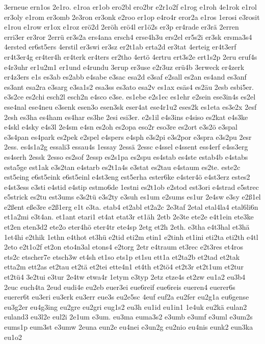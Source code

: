 {3erneue
ern1os
2e1ro.
e1roa
er1ob
ero2bl
ero2br
e2r1o2f
e1rog
e1roh
4e1rok
e1rol
er3oly
e1rom
er3omb
2e3ron
er3onk
e2roo
er1op
e4ro4r
eror2a
e1ros
1erosi
e3rosit
e1rou
e1row
er1ox
e1roz
erö2d
2eröh
erö4l
er1ö2s
er3p
er4rade
er3rä
2erren
erri3er
er3ror
2errü
er3s2a
ers4ana
ersch4
erse4h3u
ers2el
er5s2i
er3sk
ersma3s4
4ersted
er6st5ers
4erstil
er3swi
er3sz
er2t1ab
erta2d
er3tat
4erteig
er4t3erf
er4t3er4g
er4ter4h
er4terk
er4ters
er2tho
4ertö
4ertru
ert3s2e
ert1s2p
2eru
eruf4s
e4r3uhr
er1u2m1
er1und
e4rundu
3erup
er3use
e2r3uz
erü4b
3erweck
er4zerk
er4z3ers
e1s
es3ab
es2abb
e4sabe
e3sac
esa2d
e3saf
e2sall
es2an
es4and
es3anf
es3ant
esa2ra
e3sarg
e3sa1s2
esa3ss
es3ato
esa2v
es1ax
esäs4
es2äu
2esb
esbi5er.
e3s2ce
es2chi
esch2l
esch2n
e4sco
e3se.
es1ebe
e2s1ec
es1ehr
e2sein
ese3in4s
es2el
ese4nal
ese4neu
e3senk
esen3o
esen3sk
eser4at
ese4r1u2
eses2k
es1eta
es3e2x
2esf
2esh
es3ha
es4ham
es4har
es3he
2esi
esi3er.
e2s1il
e4s3ins
e4siso
es2kat
e4s3ke
e4skl
e4sky
e4s3l
2e4sm
e4sn
es2oh
es2opa
eso2r
eso3re
es2ort
e3s2ö
e3spal
e3s4pan
es4park
es2pek
e2spel
e4spers
e4sph
e3s2pi
e3s2por
e3spra
e3s2pu
2esr
2ess.
es4s1a2g
essali3
essau4s
1essay
2essä
2essc
e4ssel
e4ssent
ess4erf
e4ss3erg
es4serh
2essk
2esso
es2sof
2essp
es2s1pa
es2spu
es4stab
es4ste
estab4b
e4stabs
esta5ge
est1ak
e3s2tan
e4starb
es2t1a4s
e3stat
es2tau
e4staum
es2te.
este2c
est5eing
e6st5eink
e6st5einl
e4st3eng
est5erha
ester6ke
e4ster4ö
e4st3erz
estes2
e4st3ess
e3sti
e4stid
e4stip
estmo6de
1estni
es2t1ob
e2stod
est3ori
e4strad
e5strec
e5strick
es2tu
est3ums
e3s2tü
e3s2ty
e3suh
es1um
e2sums
es1ur
2e4sw
e3sy
e2ß1el
e2ßent
eße3re
e2ß1erg
e1t
e3ta.
etab4
et2abl
et2a2c
2e3taf
2etal
etal4la4
etal6li6n
et1a2mi
e3t4an.
et1ant
etari1
et4at
etat3r
et1äh
2etb
2e3te
ete2e
e4t1ein
ete3ke
et2en
eten3d2
ete2o
eter4hö
eter4tr
ete4sp
2etg
et2h
2eth.
e3tha
e4t3hal
et3hä
1et4hi
e2thik
1ethn
e4thot
et3hü
e2tid
eti2m
etin1
e2tinh
et1ini
eti2ta
eti2th
e4tl
2eto
e2t1o2f
et2on
eto4n3al
etons4
e2torg
2etr
e4traum
et3rec
e2t3res
et4ros
ets2c
etscher7e
etsch3w
et4sh
et1so
ets1p
et1su
ett1a
et2ta2b
et2tad
et2tak
etta2m
ett2as
et2tau
et2tä
et2tei
ette4n1
et4th
et2tö4
et2t3r
et2t1um
et2tur
et2tü4
3e2tui
e3tur
2e4tw
etwa4r
1etym
e3typ
2etz
etze4s
et2zw
eu1a2
eu3b4
2euc
euch4ta
2eud
eudi4e
eu2eb
euer3ei
eue6reif
eue6reis
eueren4
euerer6s
euerer6t
eu3eri
eu3erk
eu3err
eue3s
eu2e5sc
4euf
euf2a
eu2fer
eu2g1a
eu6gense
eu3g2er
eu4g3ing
eu2gre
eu2gri
eug1s2
eu3h
eu1id
eu1in1
1e4uk
eu2kä
eulan2
euland3
eu3l2e
eul2i
2e1um
e3um.
eu3ma
euma3s2
e3umb
e3umf
e3uml
e3um2s
eums1p
eum3st
e3umw
2euna
eun2e
eu4nei
e3un2g
eu2nio
eu4nis
eunk2
eun3ka
eu1o2
}
